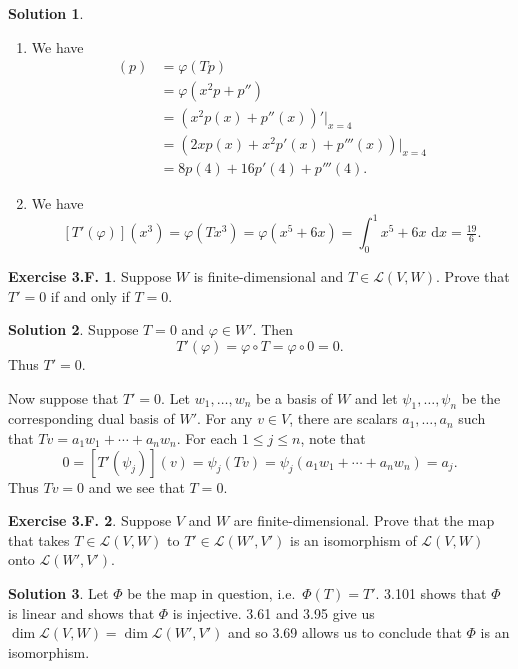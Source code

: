 \documentclass[12pt]{article}
\theoremstyle{definition}
\theoremstyle{exercise}
\newtheorem{exercise}{Exercise 3.F.}
\theoremstyle{solution}
\newtheorem*{solution}{Solution}
\newcommand{\lmap}{\mathcal{L}}
\newcommand{\upd}{\text{d}}
\begin{document}
\begin{solution}
    \begin{enumerate}
        \item We have
        \begin{align*}
            [T'(\varphi)](p) &= \varphi(Tp) \\
            &= \varphi(x^2 p + p'') \\
            &= (x^2 p(x) + p''(x))'|_{x=4} \\
            &= (2x p(x) + x^2 p'(x) + p'''(x))|_{x=4} \\
            &= 8 p(4) + 16 p'(4) + p'''(4).
        \end{align*}

        \item We have
        \[
            [T'(\varphi)](x^3) = \varphi(Tx^3) = \varphi(x^5 + 6x) = \int_0^1 x^5 + 6x \,\, \upd x = \tfrac{19}{6}.
        \]
    \end{enumerate}
\end{solution}

\begin{exercise}
\label{ex:15}
    Suppose \( W \) is finite-dimensional and \( T \in \lmap(V, W) \). Prove that \( T' = 0 \) if and only if \( T = 0 \).
\end{exercise}

\begin{solution}
    Suppose \( T = 0 \) and \( \varphi \in W' \). Then
    \[
        T'(\varphi) = \varphi \circ T = \varphi \circ 0 = 0.
    \]
    Thus \( T' = 0 \).

    Now suppose that \( T' = 0 \). Let \( w_1, \ldots, w_n \) be a basis of \( W \) and let \( \psi_1, \ldots, \psi_n \) be the corresponding dual basis of \( W' \). For any \( v \in V \), there are scalars \( a_1, \ldots, a_n \) such that \( Tv = a_1 w_1 + \cdots + a_n w_n \). For each \( 1 \leq j \leq n \), note that
    \[
        0 = [T'(\psi_j)](v) = \psi_j(Tv) = \psi_j(a_1 w_1 + \cdots + a_n w_n) = a_j.
    \]
    Thus \( Tv = 0 \) and we see that \( T = 0 \).
\end{solution}

\begin{exercise}
\label{ex:16}
    Suppose \( V \) and \( W \) are finite-dimensional. Prove that the map that takes \( T \in \lmap(V, W) \) to \( T' \in \lmap(W', V') \) is an isomorphism of \( \lmap(V, W) \) onto \( \lmap(W', V') \).
\end{exercise}

\begin{solution}
    Let \( \Phi \) be the map in question, i.e.\ \( \Phi(T) = T' \). 3.101 shows that \( \Phi \) is linear and  shows that \( \Phi \) is injective. 3.61 and 3.95 give us \( \dim \lmap(V, W) = \dim \lmap(W', V') \) and so 3.69 allows us to conclude that \( \Phi \) is an isomorphism.
\end{solution}
\end{document}
